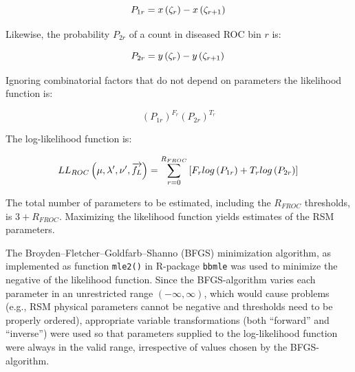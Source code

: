 \documentclass[
]{book}
\begin{document}
\begin{equation}
P_{1r} = x\left ( \zeta_r \right ) - x\left ( \zeta_{r+1} \right )\\ 
\label{eq:rsm-fitting-roc-p1r}
\end{equation}

Likewise, the probability \(P_{2r}\) of a count in diseased ROC bin \(r\) is:

\begin{equation}
P_{2r} = y\left ( \zeta_r \right ) - y\left ( \zeta_{r+1} \right )\\ 
\label{eq:rsm-fitting-roc-p2r}
\end{equation}

Ignoring combinatorial factors that do not depend on parameters the likelihood function is:

\[\left ( P_{1r} \right )^{F_r}  \left ( P_{2r} \right )^{T_r}\]

The log-likelihood function is:

\begin{equation}
LL_{ROC} \left ( \mu, \lambda', \nu', \overrightarrow{f_L} \right )= \sum_{r=0}^{R_{FROC}} \left [F_r log \left (P_{1r}  \right ) + T_r log \left (P_{2r}  \right )  \right ] \\
\label{eq:rsm-fitting-roc-ll2}
\end{equation}

The total number of parameters to be estimated, including the \(R_{FROC}\) thresholds, is \(3+R_{FROC}\). Maximizing the likelihood function yields estimates of the RSM parameters.

The Broyden--Fletcher--Goldfarb--Shanno (BFGS) \citep{RN2646, RN2647, RN2648, RN2649, RN2651, RN2650} minimization algorithm, as implemented as function \texttt{mle2()} in R-package \texttt{bbmle} \citep{packageBbmle} was used to minimize the negative of the likelihood function. Since the BFGS-algorithm varies each parameter in an unrestricted range \((-\infty, \infty)\), which would cause problems (e.g., RSM physical parameters cannot be negative and thresholds need to be properly ordered), appropriate variable transformations (both ``forward'' and ``inverse'') were used so that parameters supplied to the log-likelihood function were always in the valid range, irrespective of values chosen by the BFGS-algorithm.
\end{document}
